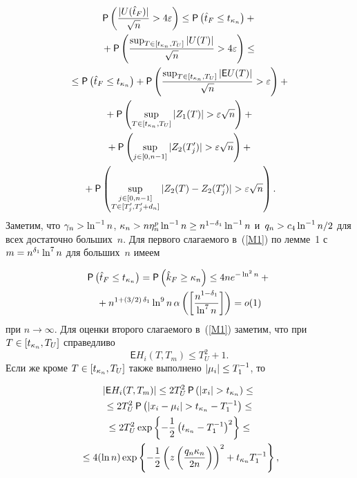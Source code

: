 \begin{multicols}{2}
\noindent
\begin{multline}
{\sf P} \left( \displaystyle\frac{\displaystyle |U(\hat{t}_F)|\mathstrut}{\displaystyle \sqrt{n}\mathstrut}> 4\varepsilon \right) \leq 
{\sf P}\left(\hat{t}_F \leq t_{\kappa_n}\right) + {}\\
{}+{\sf P} \left(\displaystyle\frac{\displaystyle \sup\nolimits_{T\in 
[t_{\kappa_n}, T_U]} |U(T)|\mathstrut}{\displaystyle \sqrt{n}\mathstrut}>4\varepsilon \right)\leq  {}\\
{}\leq {\sf P}\left(\hat{t}_F \leq t_{\kappa_n}\right) + {\sf P}\left(\displaystyle\frac{\displaystyle \sup\nolimits_{T\in 
[t_{\kappa_n}, T_U]} |{\mathsf E} U(T)|\mathstrut}{\displaystyle \sqrt{n}\mathstrut}>\varepsilon\right)+{}\\
{}+ {\sf P} \left(\sup\limits_{T\in [t_{\kappa_n}, T_U]} |Z_1(T)| > 
\varepsilon\sqrt{n}\right) +{}\\
{}+ {\sf P} \left(\sup\limits_{j \in [0, n-1]} |Z_2(T_j^{\prime})| > 
\varepsilon\sqrt{n}\right) +{}\\
{}+ {\sf P} \left(\sup\limits_{\substack{j \in [0, n-1] \\
 T\in [T_j^{\prime},T_j^{\prime}+d_n]}} |Z_2(T)-Z_2(T_j^{\prime})| > \varepsilon\sqrt{n}\right).
\label{M1}
\end{multline}
Заметим, что $\gamma_n\hm > \ln^{-1} n$, $\kappa_n\hm > n \eta_n^p \ln ^{-1} n \hm\geq 
n^{1-\delta_1} \ln ^{-1} n$ и~$q_n\hm > c_4 \ln ^{-1} n /2$ для всех достаточно 
больших~$n$.
Для первого слагаемого в~(\ref{M1}) по лемме~1 с~$m \hm= n^{\delta_1} \ln 
^7 n$ для  больших~$n$ имеем

\vspace*{-3pt}

\noindent
\begin{multline}
\label{M1next}
{\sf P}\left(\hat{t}_F \leq t_{\kappa_n}\right)  = {\sf P} \left(\hat{k}_F \geq \kappa_n 
\right) \leq 4 n e^{-\ln^2 n} + {}\\
{}+n^{1+(3/2)\,\delta_1} \ln^9 n \, 
\alpha\left(\left[\displaystyle\frac{\displaystyle n^{1-\delta_1}\mathstrut}{\displaystyle \ln^{7} n\mathstrut}\right]\right) = o(1)
\end{multline}
при $n\to\infty$. 
Для оценки второго слагаемого в~(\ref{M1}) заметим, что при $T \hm\in 
[t_{\kappa_n}, T_U]$ справедливо
\begin{equation}
\label{M2}
{\mathsf E} H_i(T, T_m) \leq T_U^2 + 1.
\end{equation}
Если же кроме $T \hm\in [t_{\kappa_n}, T_U]$ также выполнено $|\mu_i| \hm\leq T_1^{-1}$, то

\vspace*{-6pt}

\noindent
\begin{multline*}
|{\mathsf E} H_i (T, T_m)| \leq 2 T_U^2 \, {\sf P} \left(|x_i| > t_{\kappa_n}\right) \leq {}\\
{}\leq2 
T_U^2 \, {\sf P} \left(|x_i-\mu_i| > t_{\kappa_n}-T_1^{-1}\right) \leq{}\\
{}\leq 2 T_U^2  \exp\left\{ -\displaystyle\frac{\displaystyle 1\mathstrut}{\displaystyle 2\mathstrut} \left(t_{\kappa_n} - T_1^{-
1}\right)^2 \right\}  \leq{}\\
{}\leq
 4 (\ln n)  \exp\left\{ -\displaystyle\frac{\displaystyle 1\mathstrut}{\displaystyle 2\mathstrut} 
\left(z\left(\displaystyle\frac{\displaystyle q_n\kappa_n\mathstrut}{\displaystyle 2n\mathstrut}\right)\right)^2 + t_{\kappa_n} T_1^{-
1}\right\},
\end{multline*}


\end{multicols}
